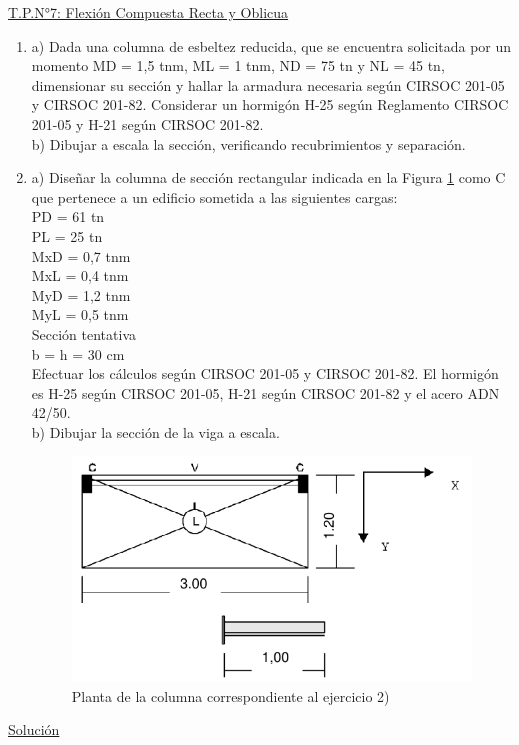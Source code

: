 \begin{center}
\underline{\Large{T.P.N°7: Flexión Compuesta Recta y Oblicua}}
\end{center}

\begin{enumerate}
\item a) Dada una columna de esbeltez reducida, que se encuentra solicitada por un momento MD = 1,5 tnm, ML = 1 tnm, ND = 75 tn y NL = 45 tn, dimensionar su sección y hallar la armadura necesaria según CIRSOC 201-05 y CIRSOC 201-82. Considerar un hormigón H-25 según Reglamento CIRSOC 201-05 y H-21 según CIRSOC 201-82.\\
b) Dibujar a escala la sección, verificando recubrimientos y separación.

\item a) Diseñar la columna de sección rectangular indicada en la Figura \ref{figura1} como C que pertenece a un edificio sometida a las siguientes cargas:\\
PD = 61 tn\\
PL = 25 tn\\
MxD = 0,7 tnm\\
MxL = 0,4 tnm\\
MyD = 1,2 tnm\\
MyL = 0,5 tnm\\
Sección tentativa\\
b = h = 30 cm\\
Efectuar los cálculos según CIRSOC 201-05 y CIRSOC 201-82. El hormigón es H-25 según CIRSOC 201-05, H-21 según CIRSOC 201-82 y el acero ADN 42/50.\\ 
b) Dibujar la sección de la viga a escala.

\begin{figure}[H]
\begin{center}
	 \includegraphics[scale = 0.9]{chapters/chapter_1/images/figura1.png}
     \caption{Planta de la columna correspondiente al ejercicio 2)}
     \label{figura1}
\end{center}
\end{figure}

\end{enumerate}
\newpage
\begin{center}
\underline{\Large{Solución}}
\end{center}

